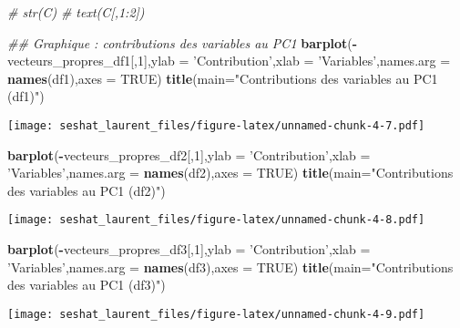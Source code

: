 \documentclass[
]{article}
\newenvironment{Shaded}{\begin{snugshade}}{\end{snugshade}}
\newcommand{\CommentTok}[1]{\textcolor[rgb]{0.56,0.35,0.01}{\textit{#1}}}
\newcommand{\DataTypeTok}[1]{\textcolor[rgb]{0.13,0.29,0.53}{#1}}
\newcommand{\DecValTok}[1]{\textcolor[rgb]{0.00,0.00,0.81}{#1}}
\newcommand{\KeywordTok}[1]{\textcolor[rgb]{0.13,0.29,0.53}{\textbf{#1}}}
\newcommand{\NormalTok}[1]{#1}
\newcommand{\OperatorTok}[1]{\textcolor[rgb]{0.81,0.36,0.00}{\textbf{#1}}}
\newcommand{\OtherTok}[1]{\textcolor[rgb]{0.56,0.35,0.01}{#1}}
\newcommand{\StringTok}[1]{\textcolor[rgb]{0.31,0.60,0.02}{#1}}
\begin{document}
\begin{Shaded}
\begin{Highlighting}[]
\CommentTok{# str(C)}
\CommentTok{# text(C[,1:2])}

\CommentTok{## Graphique : contributions des variables au PC1}
\KeywordTok{barplot}\NormalTok{(}\OperatorTok{-}\NormalTok{vecteurs_propres_df1[,}\DecValTok{1}\NormalTok{],}\DataTypeTok{ylab =} \StringTok{'Contribution'}\NormalTok{,}\DataTypeTok{xlab =} \StringTok{'Variables'}\NormalTok{,}\DataTypeTok{names.arg =} \KeywordTok{names}\NormalTok{(df1),}\DataTypeTok{axes =} \OtherTok{TRUE}\NormalTok{)}
\KeywordTok{title}\NormalTok{(}\DataTypeTok{main=}\StringTok{"Contributions des variables au PC1 (df1)"}\NormalTok{)}
\end{Highlighting}
\end{Shaded}

\texttt{[image: seshat\_laurent\_files/figure-latex/unnamed-chunk-4-7.pdf]}

\begin{Shaded}
\begin{Highlighting}[]
\KeywordTok{barplot}\NormalTok{(}\OperatorTok{-}\NormalTok{vecteurs_propres_df2[,}\DecValTok{1}\NormalTok{],}\DataTypeTok{ylab =} \StringTok{'Contribution'}\NormalTok{,}\DataTypeTok{xlab =} \StringTok{'Variables'}\NormalTok{,}\DataTypeTok{names.arg =} \KeywordTok{names}\NormalTok{(df2),}\DataTypeTok{axes =} \OtherTok{TRUE}\NormalTok{)}
\KeywordTok{title}\NormalTok{(}\DataTypeTok{main=}\StringTok{"Contributions des variables au PC1 (df2)"}\NormalTok{)}
\end{Highlighting}
\end{Shaded}

\texttt{[image: seshat\_laurent\_files/figure-latex/unnamed-chunk-4-8.pdf]}

\begin{Shaded}
\begin{Highlighting}[]
\KeywordTok{barplot}\NormalTok{(}\OperatorTok{-}\NormalTok{vecteurs_propres_df3[,}\DecValTok{1}\NormalTok{],}\DataTypeTok{ylab =} \StringTok{'Contribution'}\NormalTok{,}\DataTypeTok{xlab =} \StringTok{'Variables'}\NormalTok{,}\DataTypeTok{names.arg =} \KeywordTok{names}\NormalTok{(df3),}\DataTypeTok{axes =} \OtherTok{TRUE}\NormalTok{)}
\KeywordTok{title}\NormalTok{(}\DataTypeTok{main=}\StringTok{"Contributions des variables au PC1 (df3)"}\NormalTok{)}
\end{Highlighting}
\end{Shaded}

\texttt{[image: seshat\_laurent\_files/figure-latex/unnamed-chunk-4-9.pdf]}
\end{document}
